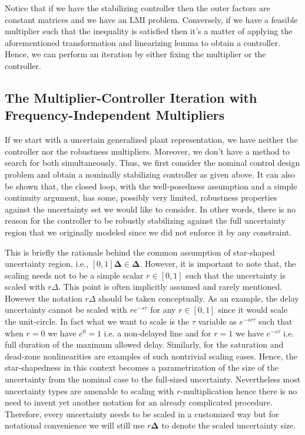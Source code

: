 Notice that if we have the stabilizing controller then the outer factors are constant matrices and we have an LMI problem. Conversely, if we have a 
feasible multiplier such that the inequality is satisfied then it's a matter of applying the aforementioned transformation and linearizing lemma to obtain
a controller. Hence, we can perform an iteration by either fixing the multiplier or the controller. 

\subsection{The Multiplier-Controller Iteration with Frequency-Independent Multipliers}

If we start with a uncertain generalized plant representation, we have neither the controller nor the robustness multipliers. Moreover, we don't have a 
method to search for both simultaneously. Thus, we first consider the nominal control design problem and obtain a nominally stabilizing controller as 
given above. It can also be shown that, the closed loop, with the well-posedness assumption and a simple continuity argument, has some, possibly very 
limited, robustness properties against the uncertainty set we would like to consider. In other words, there is no reason for the controller to be robustly 
stabilizing against the full uncertainty region that we originally modeled since we did not enforce it by any constraint. 

\begin{rem}
This is briefly the rationale behind the common assumption of star-shaped uncertainty region, i.e., $[0,1]\bm{\Delta}\in\bm{\Delta}$. However, it is 
important to note that, the scaling needs not to be a simple scalar $r\in[0,1]$ such that the uncertainty is scaled with $r\Delta$. This point is often
implicitly assumed and rarely mentioned. However the notation $r\Delta$ should be taken conceptually. As an example, 
the delay uncertainty cannot be scaled with $re^{-s\tau}$ for any $r\in[0,1]$ since it would scale the unit-circle. In fact what we want to scale 
is the $\tau$ variable as $e^{-sr\tau}$ such that when $r=0$ we have $e^0=1$ i.e. a non-delayed line and for $r=1$ we have $e^{-s\tau}$ i.e. full 
duration of the maximum allowed delay. Similarly, for the saturation and dead-zone nonlinearities are examples of such nontrivial scaling cases. Hence, 
the star-shapedness in this context becomes a parametrization of the size of the uncertainty from the nominal case to the full-sized uncertainty. 
Nevertheless most uncertainty types are amenable to scaling with $r$-multiplication hence there is no need to invent yet another
notation for an already complicated procedure. Therefore, every uncertainty needs to be scaled in a customized way but for notational convenience we will 
still use $r\bm{\Delta}$ to denote the scaled uncertainty size. 
\end{rem}





